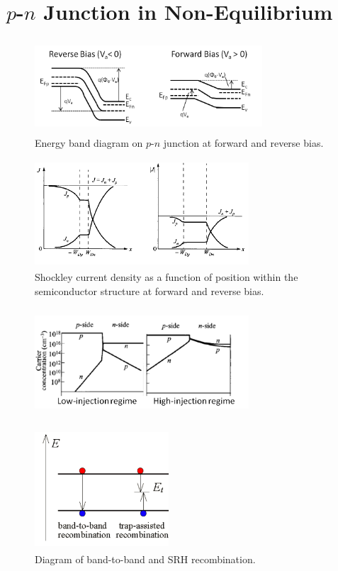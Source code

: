 \section{$p$-$n$ Junction in Non-Equilibrium}\label{sec:sec003}

\begin{figure}[h!]\label{fig:fig05}
    \centering
    \includegraphics[height=3.5cm,width=8.5cm]{figs/bias_pn_junction}
    \caption{Energy band diagram on $p$-$n$ junction at forward and reverse bias.}
\end{figure}

\begin{figure}[h!]\label{fig:fig07}
    \centering
    \includegraphics[height=4cm,width=8cm]{figs/schokley_current_reverse_forward}
    \caption{Shockley current density as a function of position within the semiconductor structure at forward and reverse bias.}
\end{figure}

\begin{figure}[h!]\label{fig:fig010}
    \centering
    \includegraphics[height=4cm,width=8cm]{figs/high_low_injection}
    \caption{}
\end{figure}

\begin{figure}[h!]\label{fig:fig08}
    \centering
    \includegraphics[height=4.5cm,width=5cm]{figs/recomb}
    \caption{Diagram of band-to-band and SRH recombination.}
\end{figure}

